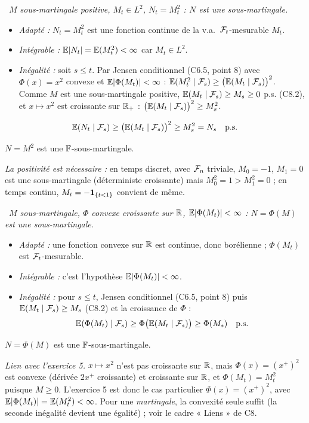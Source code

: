 \documentclass[11pt,a4paper]{article}
\newcommand{\question}[2]{\par\medskip\noindent\textbf{#1}~\textit{#2}\par\smallskip}
\begin{document}
\begin{exo}
\question{}{$M$ sous-martingale positive, $M_t\in L^2$, $N_t=M_t^2$ : $N$ est une sous-martingale.}
\begin{itemize}
  \item \emph{Adapté :} $N_t=M_t^2$ est une fonction continue de la v.a.\ $\mathcal{F}_t$-mesurable $M_t$.
  \item \emph{Intégrable :} $\mathbb{E}|N_t|=\mathbb{E}(M_t^2)<\infty$ car $M_t\in L^2$.
  \item \emph{Inégalité :} soit $s\le t$. Par Jensen conditionnel (C6.5, point 8) avec $\Phi(x)=x^2$ convexe et $\mathbb{E}|\Phi(M_t)|<\infty$ :
  $\mathbb{E}(M_t^2\mid\mathcal{F}_s)\ge\bigl(\mathbb{E}(M_t\mid\mathcal{F}_s)\bigr)^2$. Comme $M$ est une sous-martingale positive,
  $\mathbb{E}(M_t\mid\mathcal{F}_s)\ge M_s\ge0$ p.s. (C8.2), et $x\mapsto x^2$ est croissante sur $\mathbb{R}_+$ : $\bigl(\mathbb{E}(M_t\mid\mathcal{F}_s)\bigr)^2\ge M_s^2$.
\end{itemize}
\[\mathbb{E}(N_t\mid\mathcal{F}_s)\ge\bigl(\mathbb{E}(M_t\mid\mathcal{F}_s)\bigr)^2\ge M_s^2=N_s\quad\text{p.s.}\]
\begin{resultat}$N=M^2$ est une $\mathbb{F}$-sous-martingale.\end{resultat}
\textit{La positivité est nécessaire :} en temps discret, avec $\mathcal{F}_n$ triviale, $M_0=-1$, $M_1=0$ est une sous-martingale (déterministe
croissante) mais $M_0^2=1>M_1^2=0$ ; en temps continu, $M_t=-\mathbf{1}_{\{t<1\}}$ convient de même.
\end{exo}

\begin{exo}
\question{}{$M$ sous-martingale, $\Phi$ convexe croissante sur $\mathbb{R}$, $\mathbb{E}|\Phi(M_t)|<\infty$ : $N=\Phi(M)$ est une sous-martingale.}
\begin{itemize}
  \item \emph{Adapté :} une fonction convexe sur $\mathbb{R}$ est continue, donc borélienne ; $\Phi(M_t)$ est $\mathcal{F}_t$-mesurable.
  \item \emph{Intégrable :} c'est l'hypothèse $\mathbb{E}|\Phi(M_t)|<\infty$.
  \item \emph{Inégalité :} pour $s\le t$, Jensen conditionnel (C6.5, point 8) puis $\mathbb{E}(M_t\mid\mathcal{F}_s)\ge M_s$ (C8.2) et la croissance de $\Phi$ :
  \[\mathbb{E}(\Phi(M_t)\mid\mathcal{F}_s)\ge\Phi\bigl(\mathbb{E}(M_t\mid\mathcal{F}_s)\bigr)\ge\Phi(M_s)\quad\text{p.s.}\]
\end{itemize}
\begin{resultat}$N=\Phi(M)$ est une $\mathbb{F}$-sous-martingale.\end{resultat}
\emph{Lien avec l'exercice 5.} $x\mapsto x^2$ n'est pas croissante sur $\mathbb{R}$, mais $\Phi(x)=(x^+)^2$ est convexe (dérivée $2x^+$ croissante)
et croissante sur $\mathbb{R}$, et $\Phi(M_t)=M_t^2$ puisque $M\ge0$. L'exercice 5 est donc le cas particulier $\Phi(x)=(x^+)^2$, avec
$\mathbb{E}|\Phi(M_t)|=\mathbb{E}(M_t^2)<\infty$. Pour une \emph{martingale}, la convexité seule suffit (la seconde inégalité devient une égalité) ; voir
le cadre « Liens » de C8.
\end{exo}
\end{document}
